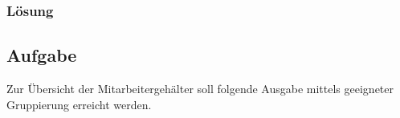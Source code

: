 \subsubsection*{Lösung}
\label{sec:uebung_06.aufgabe_01.loesung}


\subsection{Aufgabe}
\label{sec:uebung_06.aufgabe_02}
Zur Übersicht der Mitarbeitergehälter soll folgende Ausgabe mittels geeigneter Gruppierung erreicht werden.

